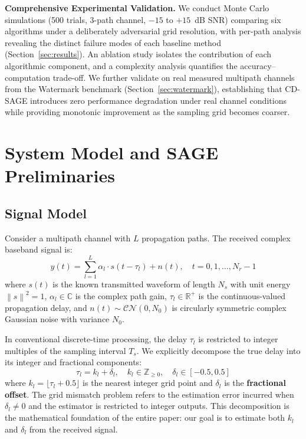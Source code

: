 \documentclass[journal]{IEEEtran}
\newcommand{\Cc}{\mathbb{C}}
\newcommand{\Rr}{\mathbb{R}}
\newcommand{\Zz}{\mathbb{Z}}
\newcommand{\cN}{\mathcal{CN}}
\newcommand{\norm}[1]{\left\lVert #1 \right\rVert}
\begin{document}
\noindent\textbf{Comprehensive Experimental Validation.} We conduct Monte Carlo simulations (500 trials, 3-path channel, $-15$ to $+15$~dB SNR) comparing six algorithms under a deliberately adversarial grid resolution, with per-path analysis revealing the distinct failure modes of each baseline method (Section~\ref{sec:results}). An ablation study isolates the contribution of each algorithmic component, and a complexity analysis quantifies the accuracy--computation trade-off. We further validate on real measured multipath channels from the Watermark benchmark (Section~\ref{sec:watermark}), establishing that CD-SAGE introduces zero performance degradation under real channel conditions while providing monotonic improvement as the sampling grid becomes coarser.

\section{System Model and SAGE Preliminaries}
\label{sec:system}

\subsection{Signal Model}

Consider a multipath channel with $L$ propagation paths. The received complex baseband signal is:
\begin{equation}
y(t) = \sum_{l=1}^{L} \alpha_l \cdot s(t - \tau_l) + n(t), \quad t = 0, 1, \ldots, N_r-1
\label{eq:sigmodel}
\end{equation}
where $s(t)$ is the known transmitted waveform of length $N_s$ with unit energy $\norm{s}^2 = 1$, $\alpha_l \in \Cc$ is the complex path gain, $\tau_l \in \Rr^+$ is the continuous-valued propagation delay, and $n(t) \sim \cN(0, N_0)$ is circularly symmetric complex Gaussian noise with variance $N_0$.

In conventional discrete-time processing, the delay $\tau_l$ is restricted to integer multiples of the sampling interval $T_s$. We explicitly decompose the true delay into its integer and fractional components:
\begin{equation}
\tau_l = k_l + \delta_l, \quad k_l \in \Zz_{\geq 0}, \quad \delta_l \in [-0.5, 0.5]
\label{eq:decomp}
\end{equation}
where $k_l = \lfloor \tau_l + 0.5 \rfloor$ is the nearest integer grid point and $\delta_l$ is the \textbf{fractional offset}. The grid mismatch problem refers to the estimation error incurred when $\delta_l \neq 0$ and the estimator is restricted to integer outputs. This decomposition is the mathematical foundation of the entire paper: our goal is to estimate both $k_l$ and $\delta_l$ from the received signal.
\end{document}
